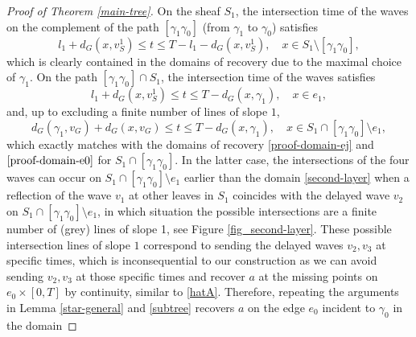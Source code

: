 \documentclass[11pt]{amsart}
\theoremstyle{definition}
\theoremstyle{plain}
\numberwithin{equation}{section}
\begin{document}
\begin{proof}[Proof of Theorem \ref{main-tree}]
On the sheaf $S_1$, the intersection time of the waves on the complement of the path $[\gamma_1 \gamma_0]$ (from $\gamma_1$ to $\gamma_0$) satisfies
\begin{equation}
l_1+d_G(x,v_S^1) \leq t \leq T-l_1-d_G(x,v_S^1), \quad x\in S_1\setminus [\gamma_1 \gamma_0],
\end{equation}
which is clearly contained in the domains of recovery due to the maximal  choice of $\gamma_1$.
On the path $[\gamma_1 \gamma_0]\cap S_1$, the intersection time of the waves satisfies
\begin{equation}
l_1+d_G(x,v_S^1) \leq t\leq T-d_G(x,\gamma_1),\quad x\in e_1,
\end{equation}
and, up to excluding a finite number of lines of slope $1$,
\begin{equation} \label{second-layer}
d_G(\gamma_1,v_G)+d_G(x,v_G) \leq t \leq T-d_G(x,\gamma_1),\quad x\in S_1\cap [\gamma_1 \gamma_0] \setminus e_1,
\end{equation}
which exactly matches with the domains of recovery \eqref{proof-domain-ej} and $\eqref{proof-domain-e0}$ for $S_1\cap [\gamma_1 \gamma_0]$.
In the latter case, the intersections of the four waves can occur on $S_1\cap [\gamma_1 \gamma_0] \setminus e_1$ earlier than the domain \eqref{second-layer} when a reflection of the wave $v_1$ at other leaves in $S_1$ coincides with the delayed wave $v_2$ on $S_1\cap [\gamma_1 \gamma_0] \setminus e_1$, in which situation the possible intersections are a finite number of (grey) lines of slope 1, see Figure \ref{fig_second-layer}. 
These possible intersection lines of slope $1$ correspond to sending the delayed waves $v_2,v_3$ at specific times, which is inconsequential to our construction as we can avoid sending $v_2,v_3$ at those specific times and recover $a$ at the missing points on $e_0\times [0,T]$ by continuity, similar to \eqref{hatA}.
Therefore, repeating the arguments in Lemma \ref{star-general} and \ref{subtree} recovers $a$ on the edge $e_0$ incident to $\gamma_0$ in the domain

\end{proof}
\end{document}
